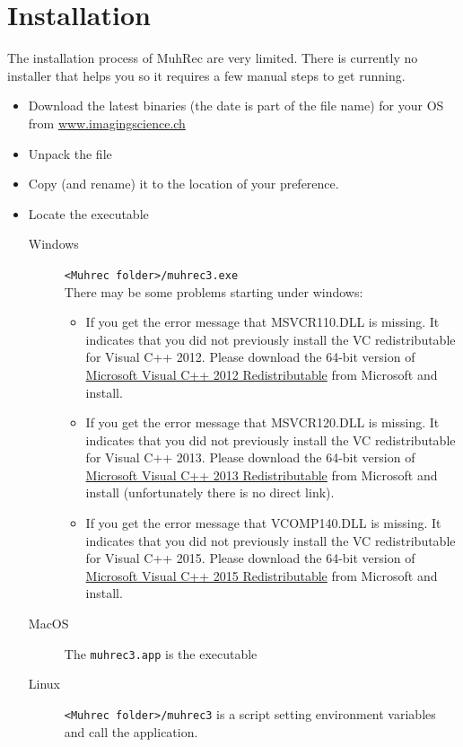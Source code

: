 \documentclass[a4paper]{scrreprt}
\begin{document}
\section{Installation}
The installation process of MuhRec are very limited. There is currently no installer that helps you so it requires a few manual steps to get running.
\begin{itemize}
\item Download the latest binaries (the date is part of the file name) for your OS from \href{http://www.imagingscience.ch}{www.imagingscience.ch}
\item Unpack the file
\item Copy (and rename) it to the location of your preference.
\item Locate the executable
\begin{description}
\item[Windows] \verb+<Muhrec folder>/muhrec3.exe+\\
There may be some problems starting under windows:
\begin{itemize}
	\item  If you get the error message that MSVCR110.DLL is missing. It indicates that you did not previously install the VC redistributable for Visual C++ 2012. Please download the 64-bit version of \href{https://www.microsoft.com/en-us/download/details.aspx?id=30679}{Microsoft Visual C++ 2012 Redistributable} from Microsoft and install.
	\item  If you get the error message that MSVCR120.DLL is missing. It indicates that you did not previously install the VC redistributable for Visual C++ 2013. Please download the 64-bit version of \href{https://www.microsoft.com/en-US/download/details.aspx?id=40784}{Microsoft Visual C++ 2013 Redistributable} from Microsoft and install (unfortunately there is no direct link).
	\item If you get the error message that VCOMP140.DLL is missing. It indicates that you did not previously install the VC redistributable for Visual C++ 2015. Please download the 64-bit version of  \href{https://www.microsoft.com/en-us/download/details.aspx?id=53587}{Microsoft Visual C++ 2015 Redistributable} from Microsoft and install.
\end{itemize}
\item[MacOS] The \verb+muhrec3.app+ is the executable
\item[Linux] \verb+<Muhrec folder>/muhrec3+ is a script setting environment variables and call the application. 
\end{description}

\end{itemize}
\end{document}
